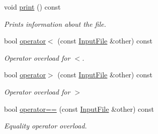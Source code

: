 \begin{DoxyCompactItemize}
void \hyperlink{class_input_file_a7a27c978d7aebf861360c642ddb47ef5}{print} () const
\begin{DoxyCompactList}\small\item\em Prints information about the file. \end{DoxyCompactList}\item 
bool \hyperlink{class_input_file_a8c7c438538b8b183454632c27a55f701}{operator$<$} (const \hyperlink{class_input_file}{Input\+File} \&other) const
\begin{DoxyCompactList}\small\item\em Operator overload for $<$. \end{DoxyCompactList}\item 
bool \hyperlink{class_input_file_a4bf7efae68f3f378d1d4d1565fce8081}{operator$>$} (const \hyperlink{class_input_file}{Input\+File} \&other) const
\begin{DoxyCompactList}\small\item\em Operator overload for $>$ \end{DoxyCompactList}\item 
bool \hyperlink{class_input_file_aba80d895922ad25de1bdd7724d35755a}{operator==} (const \hyperlink{class_input_file}{Input\+File} \&other) const
\begin{DoxyCompactList}\small\item\em Equality operator overload. \end{DoxyCompactList}\end{DoxyCompactItemize}
